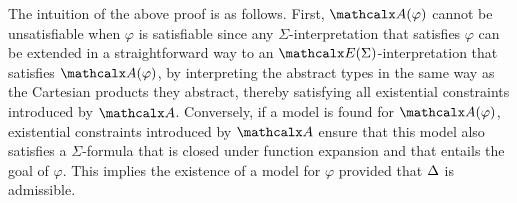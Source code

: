 The intuition of the above proof is as follows.
First, $\conv( \varphi )$ cannot be unsatisfiable when $\varphi$ is satisfiable
since any $\Sigma$-interpretation that satisfies $\varphi$ can be extended in a straightforward way to
an $\extendsig{\Sigma}$-interpretation that satisfies $\conv( \varphi )$, by
interpreting the abstract types in the same way as the Cartesian products they
abstract, thereby satisfying all existential constraints introduced by $\conv$.
Conversely, if a model is found for $\conv( \varphi )$,
existential constraints
introduced by $\conv$ ensure that this model also satisfies
a $\Sigma$-formula that is closed under function expansion and
that entails the goal of $\varphi$.
This implies the existence of a model for $\varphi$
provided that $\DDD$ is admissible.


